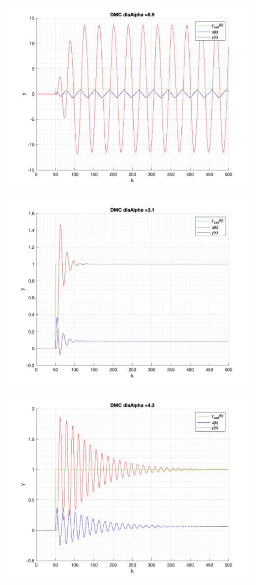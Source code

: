 \documentclass[a4paper, 11pt]{article}
\begin{document}
\begin{enumerate}
 \includegraphics[width=\linewidth]{./ModelsDodatkowe_Alpha/P4_DMC_Alpha_8_9_png.png} 
 
 \includegraphics[width=\linewidth]{./ModelsDodatkowe_Alpha/P4_DMC_Alpha_3_1_png.png} 
 
 \includegraphics[width=\linewidth]{./ModelsDodatkowe_Alpha/P4_DMC_Alpha_4_3_png.png} 
 

\end{enumerate}
\end{document}
